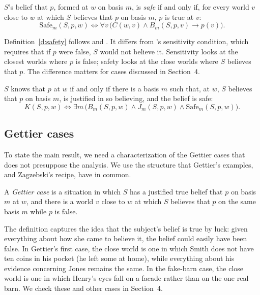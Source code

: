 \documentclass{situationist-preprint}
\begin{document}
\begin{definition}[Safety]\label{d:safety}
$S$'s belief that $p$, formed at $w$ on basis $m$, is \emph{safe} if and only if, for every world $v$ close to $w$ at which $S$ believes that $p$ on basis $m$, $p$ is true at $v$:
\[
\mathrm{Safe}_m(S,p,w) \iff \forall v\,\big(C(w,v) \wedge B_m(S,p,v) \to p(v)\big).
\]
\end{definition}

Definition~\ref{d:safety} follows \citet{Williamson2000} and \citet{Pritchard2005}. It differs from \citet{Nozick1981}'s sensitivity condition, which requires that if $p$ were false, $S$ would not believe it. Sensitivity looks at the closest worlds where $p$ is false; safety looks at the close worlds where $S$ believes that $p$. The difference matters for cases discussed in Section~4.

\begin{definition}[Knowledge]\label{d:knowledge}
$S$ knows that $p$ at $w$ if and only if there is a basis $m$ such that, at $w$, $S$ believes that $p$ on basis $m$, is justified in so believing, and the belief is safe:
\[
K(S,p,w) \iff \exists m\,\big(B_m(S,p,w) \wedge J_m(S,p,w) \wedge \mathrm{Safe}_m(S,p,w)\big).
\]
\end{definition}

\subsection{Gettier cases}

To state the main result, we need a characterization of the Gettier cases that does not presuppose the analysis. We use the structure that Gettier's examples, and Zagzebski's recipe, have in common.

\begin{definition}\label{d:gettier}
A \emph{Gettier case} is a situation in which $S$ has a justified true belief that $p$ on basis $m$ at $w$, and there is a world $v$ close to $w$ at which $S$ believes that $p$ on the same basis $m$ while $p$ is false.
\end{definition}

The definition captures the idea that the subject's belief is true by luck: given everything about how she came to believe it, the belief could easily have been false. In Gettier's first case, the close world is one in which Smith does not have ten coins in his pocket (he left some at home), while everything about his evidence concerning Jones remains the same. In the fake-barn case, the close world is one in which Henry's eyes fall on a facade rather than on the one real barn. We check these and other cases in Section~4.
\end{document}
